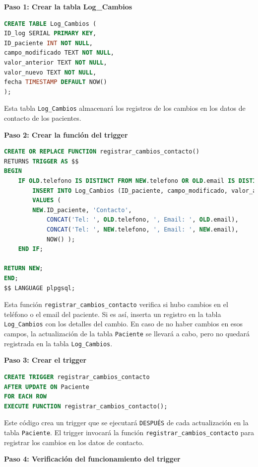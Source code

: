 \documentclass[spanish]{article}
\begin{document}
\textbf{Paso 1: Crear la tabla Log\_Cambios}

\begin{lstlisting}[language=SQL] 
CREATE TABLE Log_Cambios ( 
ID_log SERIAL PRIMARY KEY, 
ID_paciente INT NOT NULL,
campo_modificado TEXT NOT NULL, 
valor_anterior TEXT NOT NULL,
valor_nuevo TEXT NOT NULL,
fecha TIMESTAMP DEFAULT NOW()
);  
\end{lstlisting}

Esta tabla \texttt{Log\_Cambios} almacenará los registros de los cambios en los datos de contacto de los pacientes.

\textbf{Paso 2: Crear la función del trigger}

\begin{lstlisting}[language=SQL] 
CREATE OR REPLACE FUNCTION registrar_cambios_contacto() 
RETURNS TRIGGER AS $$ 
BEGIN 
    IF OLD.telefono IS DISTINCT FROM NEW.telefono OR OLD.email IS DISTINCT FROM NEW.email THEN
        INSERT INTO Log_Cambios (ID_paciente, campo_modificado, valor_anterior, valor_nuevo, fecha) 
        VALUES ( 
        NEW.ID_paciente, 'Contacto', 
            CONCAT('Tel: ', OLD.telefono, ', Email: ', OLD.email), 
            CONCAT('Tel: ', NEW.telefono, ', Email: ', NEW.email), 
            NOW() ); 
    END IF;

RETURN NEW;
END; 
$$ LANGUAGE plpgsql; 
\end{lstlisting}

Esta función \texttt{registrar\_cambios\_contacto} verifica si hubo cambios en el teléfono o el email del paciente. Si es así, inserta un registro en la tabla \texttt{Log\_Cambios} con los detalles del cambio. En caso de no haber cambios en esos campos, la actualización de la tabla \texttt{Paciente} se llevará a cabo, pero no quedará registrada en la tabla \texttt{Log\_Cambios}.

\textbf{Paso 3: Crear el trigger}

\begin{lstlisting}[language=SQL] 
CREATE TRIGGER registrar_cambios_contacto 
AFTER UPDATE ON Paciente 
FOR EACH ROW 
EXECUTE FUNCTION registrar_cambios_contacto(); 
\end{lstlisting}

Este código crea un trigger que se ejecutará \texttt{DESPUÉS} de cada actualización en la tabla \texttt{Paciente}. El trigger invocará la función \texttt{registrar\_cambios\_contacto} para registrar los cambios en los datos de contacto.

\textbf{Paso 4: Verificación del funcionamiento del trigger}
\end{document}
